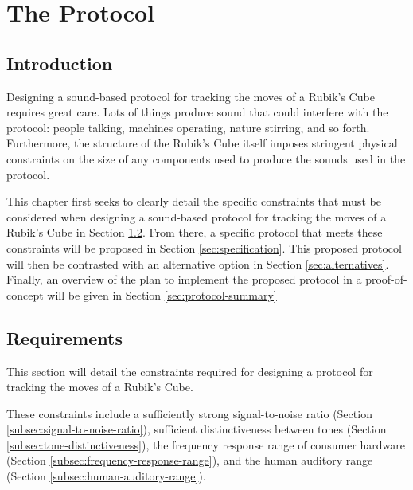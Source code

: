 %

\chapter{The Protocol}

\label{Chapter4}


\section{Introduction}

Designing a sound-based protocol for tracking the moves of a Rubik's
Cube requires great care. Lots of things produce sound that could
interfere with the protocol: people talking, machines operating, nature
stirring, and so forth. Furthermore, the structure of the Rubik's Cube
itself imposes stringent physical constraints on the size of any
components used to produce the sounds used in the protocol.

This chapter first seeks to clearly detail the specific constraints
that must be considered when designing a sound-based protocol for
tracking the moves of a Rubik's Cube in Section
\ref{sec:protocol-requirements}. From there, a specific protocol that
meets these constraints will be proposed in Section
\ref{sec:specification}. This proposed protocol will then be contrasted
with an alternative option in Section \ref{sec:alternatives}. Finally,
an overview of the plan to implement the proposed protocol in a
proof-of-concept will be given in Section \ref{sec:protocol-summary}


\section{Requirements}
\label{sec:protocol-requirements}

This section will detail the constraints required for designing a
protocol for tracking the moves of a Rubik's Cube.

These constraints include a sufficiently strong signal-to-noise ratio
(Section \ref{subsec:signal-to-noise-ratio}), sufficient distinctiveness
between tones (Section \ref{subsec:tone-distinctiveness}), the frequency
response range of consumer hardware
(Section \ref{subsec:frequency-response-range}), and the human auditory range
(Section \ref{subsec:human-auditory-range}).

